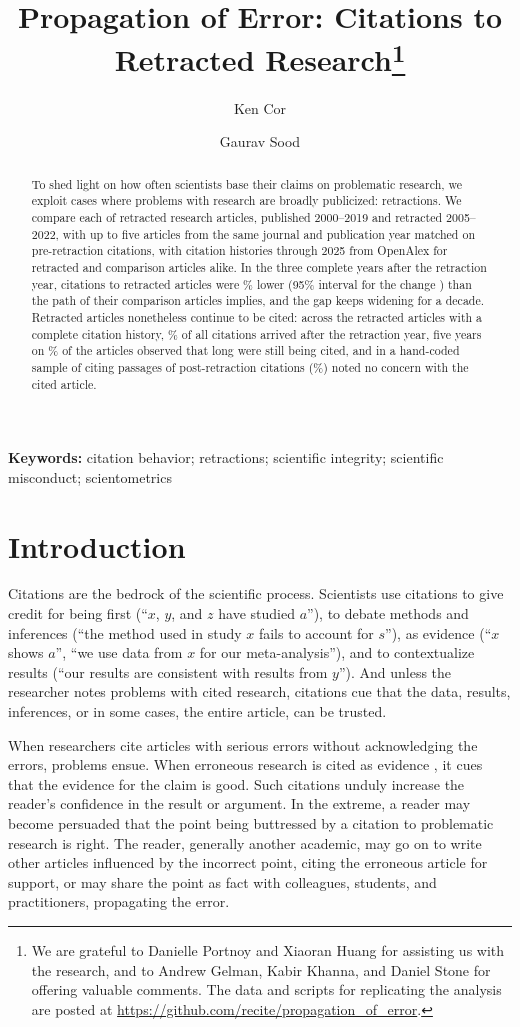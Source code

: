 \documentclass[11pt,letterpaper]{article}
\title{Propagation of Error: Citations to Retracted Research\thanks{We are grateful to Danielle Portnoy and Xiaoran Huang for assisting us with the research, and to Andrew Gelman, Kabir Khanna, and Daniel Stone for offering valuable comments. The data and scripts for replicating the analysis are posted at \url{https://github.com/recite/propagation_of_error}.}}
\author{Ken Cor \and Gaurav Sood}
\date{}
\begin{document}
\maketitle
\begin{abstract}
\noindent To shed light on how often scientists base their claims on problematic research, we exploit cases where problems with research are broadly publicized: retractions. We compare each of \Stacks{} retracted research articles, published 2000--2019 and retracted 2005--2022, with up to five articles from the same journal and publication year matched on pre-retraction citations, with citation histories through 2025 from OpenAlex for retracted and comparison articles alike. In the three complete years after the retraction year, citations to retracted articles were \MainReduction\% lower (95\% interval for the change \MainInterval) than the path of their comparison articles implies, and the gap keeps widening for a decade. Retracted articles nonetheless continue to be cited: across the \PostArticles{} retracted articles with a complete citation history, \PostAfterShare\% of all citations arrived after the retraction year, five years on \PostCitedAtFive\% of the articles observed that long were still being cited, and in a hand-coded sample of citing passages \AckAfterUnack{} of \AckAfterCoded{} post-retraction citations (\AckAfterPercent\%) noted no concern with the cited article.
\end{abstract}
\vspace{1em}
\noindent\textbf{Keywords:} citation behavior; retractions; scientific integrity; scientific misconduct; scientometrics

\newpage
\section{Introduction}
Citations are the bedrock of the scientific process. Scientists use citations to give credit for being first (``$x$, $y$, and $z$ have studied $a$''), to debate methods and inferences (``the method used in study $x$ fails to account for $s$''), as evidence (``$x$ shows $a$'', ``we use data from $x$ for our meta-analysis''), and to contextualize results (``our results are consistent with results from $y$''). And unless the researcher notes problems with cited research, citations cue that the data, results, inferences, or in some cases, the entire article, can be trusted.

When researchers cite articles with serious errors without acknowledging the errors, problems ensue. When erroneous research is cited as evidence \citep[e.g.,][]{chang2013safety, torsvik2010spontaneous}, it cues that the evidence for the claim is good. Such citations unduly increase the reader's confidence in the result or argument. In the extreme, a reader may become persuaded that the point being buttressed by a citation to problematic research is right. The reader, generally another academic, may go on to write other articles influenced by the incorrect point, citing the erroneous article for support, or may share the point as fact with colleagues, students, and practitioners, propagating the error.
\end{document}
